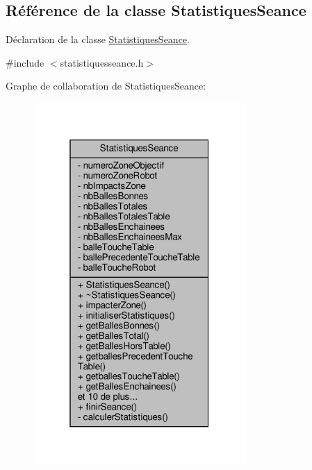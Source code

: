 \hypertarget{class_statistiques_seance}{}\subsection{Référence de la classe Statistiques\+Seance}
\label{class_statistiques_seance}


Déclaration de la classe \hyperlink{class_statistiques_seance}{Statistiques\+Seance}.  




{\ttfamily \#include $<$statistiquesseance.\+h$>$}



Graphe de collaboration de Statistiques\+Seance\+:\nopagebreak
\begin{figure}[H]
\begin{center}
\leavevmode
\includegraphics[width=229pt]{class_statistiques_seance__coll__graph}
\end{center}
\end{figure}
